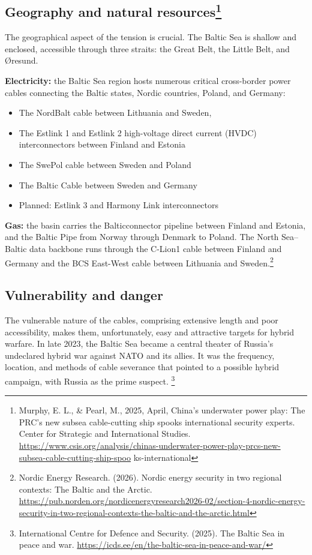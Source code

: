 \subsection[Geography and natural resources]{Geography and natural resources\footnote{Murphy, E. L., \& Pearl, M., 2025, April, China’s underwater power play: The PRC’s new subsea cable-cutting ship spooks international security experts. Center for Strategic and International Studies. \url{https://www.csis.org/analysis/chinas-underwater-power-play-prcs-new-subsea-cable-cutting-ship-spoo} ks-international}}

The geographical aspect of the tension is crucial. The Baltic Sea is shallow and enclosed, accessible through three straits: the Great Belt, the Little Belt, and Øresund.

\textbf{Electricity:} the Baltic Sea region hosts numerous critical cross-border power cables connecting the Baltic states, Nordic countries, Poland, and Germany:

\begin{itemize}
  \item The NordBalt cable between Lithuania and Sweden,
  \item The Estlink 1 and Estlink 2 high-voltage direct current (HVDC) interconnectors between Finland and Estonia
  \item The SwePol cable between Sweden and Poland
  \item The Baltic Cable between Sweden and Germany
  \item Planned: Estlink 3 and Harmony Link interconnectors
\end{itemize}

\textbf{Gas:} the basin carries the Balticconnector pipeline between Finland and Estonia, and the Baltic Pipe from Norway through Denmark to Poland. The North Sea–Baltic data backbone runs through the C-Lion1 cable between Finland and Germany and the BCS East-West cable between Lithuania and Sweden.\footnote{Nordic Energy Research. (2026). Nordic energy security in two regional contexts: The Baltic and the Arctic. \url{https://pub.norden.org/nordicenergyresearch2026-02/section-4-nordic-energy-security-in-two-regional-contexts-the-baltic-and-the-arctic.html}}

\subsection{Vulnerability and danger}

The vulnerable nature of the cables, comprising extensive length and poor accessibility, makes them, unfortunately, easy and attractive targets for hybrid warfare. In late 2023, the Baltic Sea became a central theater of Russia’s undeclared hybrid war against NATO and its allies. It was the frequency, location, and methods of cable severance that pointed to a possible hybrid campaign, with Russia as the prime suspect. \footnote{International Centre for Defence and Security. (2025). The Baltic Sea in peace and war. \url{https://icds.ee/en/the-baltic-sea-in-peace-and-war/}}
